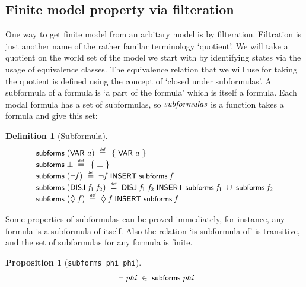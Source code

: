 \documentclass[letterpaper]{article}
\newtheorem{defn}{Definition}
\newtheorem{prop}{Proposition}
\renewcommand{\HOLConst}[1]{{\textsf{\upshape\small #1}}}
\renewcommand{\HOLinline}[1]{\ensuremath{#1}}
\newenvironment{holmath}{\begin{displaymath}\begin{array}{l}}{\end{array}\end{displaymath}\ignorespacesafterend}
\begin{document}
\subsection{Finite model property via filteration}

One way to get finite model from an arbitary model is by filteration. Filtration is just another name of the rather familar terminology `quotient'. We will take a quotient on the world set of the model we start with by identifying states via the usage of equivalence classes. The equivalence relation that we will use for taking the quotient is defined using the concept of `closed under subformulas'. A subformula of a formula is `a part of the formula' which is itself a formula. Each modal formula has a set of subformulas, so \HOLinline{\HOLFreeVar{subformulas}} is a function takes a formula and give this set:
\begin{defn}[Subformula]
\begin{holmath}
  \HOLConst{subforms}\;(\HOLConst{VAR}\;\HOLFreeVar{a})\;\HOLSymConst{\HOLTokenDefEquality{}}\;\HOLTokenLeftbrace{}\HOLConst{VAR}\;\HOLFreeVar{a}\HOLTokenRightbrace{}\\
\HOLConst{subforms}\;\HOLSymConst{\ensuremath{\bot}}\;\HOLSymConst{\HOLTokenDefEquality{}}\;\HOLTokenLeftbrace{}\HOLSymConst{\ensuremath{\bot}}\HOLTokenRightbrace{}\\
\HOLConst{subforms}\;(\HOLSymConst{\HOLTokenNeg{}}\HOLFreeVar{f})\;\HOLSymConst{\HOLTokenDefEquality{}}\;\HOLSymConst{\HOLTokenNeg{}}\HOLFreeVar{f}\;\HOLConst{INSERT}\;\HOLConst{subforms}\;\HOLFreeVar{f}\\
\HOLConst{subforms}\;(\HOLConst{DISJ}\;\HOLFreeVar{f\sb{\mathrm{1}}}\;\HOLFreeVar{f\sb{\mathrm{2}}})\;\HOLSymConst{\HOLTokenDefEquality{}}\;\HOLConst{DISJ}\;\HOLFreeVar{f\sb{\mathrm{1}}}\;\HOLFreeVar{f\sb{\mathrm{2}}}\;\HOLConst{INSERT}\;\HOLConst{subforms}\;\HOLFreeVar{f\sb{\mathrm{1}}}\;\HOLSymConst{\HOLTokenUnion{}}\;\HOLConst{subforms}\;\HOLFreeVar{f\sb{\mathrm{2}}}\\
\HOLConst{subforms}\;(\HOLSymConst{\ensuremath{\Diamond}}\;\HOLFreeVar{f})\;\HOLSymConst{\HOLTokenDefEquality{}}\;\HOLSymConst{\ensuremath{\Diamond}}\;\HOLFreeVar{f}\;\HOLConst{INSERT}\;\HOLConst{subforms}\;\HOLFreeVar{f}
\end{holmath}
\end{defn}
 Some properties of subformulas can be proved immediately, for instance, any formula is a subformula of itself. Also the relation `is subformula of' is transitive, and the set of subformulas for any formula is finite. 
\begin{prop}[\texttt{subforms_phi_phi}]
\begin{holmath}
  \ensuremath{\HOLTokenTurnstile}\HOLFreeVar{phi}\;\HOLSymConst{\HOLTokenIn{}}\;\HOLConst{subforms}\;\HOLFreeVar{phi}
\end{holmath}
\end{prop}
\end{document}
